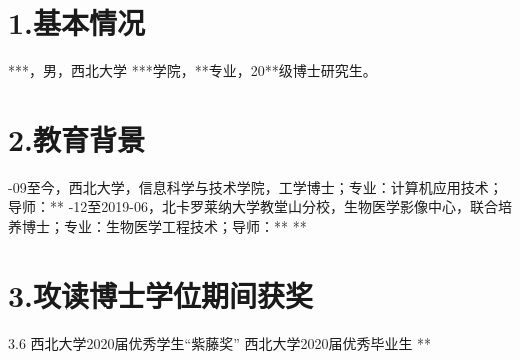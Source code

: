 
\begin{resume}

\section*{1.\hspace{0.75em}基本情况}
***，男，西北大学 ***学院，**专业，20**级博士研究生。
\section*{2.\hspace{0.75em}教育背景}
\begin{resumelist*}
-09至今，西北大学，信息科学与技术学院，工学博士；专业：计算机应用技术；导师：**
-12至2019-06，北卡罗莱纳大学教堂山分校，生物医学影像中心，联合培养博士；专业：生物医学工程技术；导师：**
\resumelistitem ***

\end{resumelist*}

\section*{3.\hspace{0.75em}攻读博士学位期间获奖}
\begin{resumelist}{\hspace{-0.25em}3.6\hspace{0.5em} }
\resumelistitem 西北大学2020届优秀学生“紫藤奖”
\resumelistitem 西北大学2020届优秀毕业生
\resumelistitem ***

\end{resumelist}

\end{resume}

